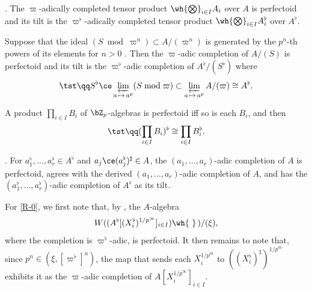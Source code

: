 \item \label{R-a} . \!\!The $\varpi$-adically completed tensor product $\wh{\bigotimes}_{i \in I} A_i$ over $A$ is perfectoid and its tilt is the $\varpi^\flat$-adically completed tensor product $\wh{\bigotimes}_{i \in I} A_i^\flat$ over $A^\flat$.

\item \label{R-b}
Suppose that the ideal $(S \bmod \varpi^n) \subset A/(\varpi^n)$ is generated by the $p^n$-th powers of its elements for $n > 0$
. Then the $\varpi$-adic completion of $A/(S)$ is perfectoid and its tilt is the $\varpi^\flat$-adic completion of $A^\flat/(S^\flat)$ where
\[
\tst\qq S^\flat \ce \varprojlim_{a\, \mapsto\, a^p} (S \bmod \varpi) \subset \varprojlim_{a\, \mapsto\, a^p} A/(\varpi) \cong A^\flat.
\]

\m \label{R-c}
A product $\prod_{i \in I} B_i$ of $\bZ_p$-algebras is perfectoid iff so is each $B_i$, and then
\[
\tst\qq (\prod_{i \in I} B_i)^\flat \cong \prod_{i \in I} B_i^\flat.
\]


\m \label{R-e}.
For $a_1^\flat, \dotsc, a_r^\flat \in A^\flat$ and $a_j \ce (a_j^\flat)^\sharp \in A$, the $(a_1, \dotsc, a_r)$-adic completion %
of $A$ is perfectoid, agrees with the derived $(a_1, \dotsc, a_r)$-adic completion of $A$, and has the $(a_1^\flat, \dotsc, a_r^\flat)$-adic completion %
of $A^\flat$ as its tilt.
\eenum
\eprop

\bpf
For \ref{R-0}, we first note that, by , the $A$-algebra
\[
W((A^\flat[(X_i^\flat)^{1/p^\infty}]_{i \in I})\wh{\ }\, )/(\xi),
\]
where the completion is $\varpi^\flat$-adic, is perfectoid. It then remains to note that, since $p^n \in (\xi, [\varpi^\flat]^n)$, the map that sends each $X_i^{1/p^m}$ to $((X_i^\flat)^{\sharp})^{1/p^m}$ exhibits it as the $\varpi$-adic completion of $A[X_i^{1/p^\infty}]_{i \in I}$.

